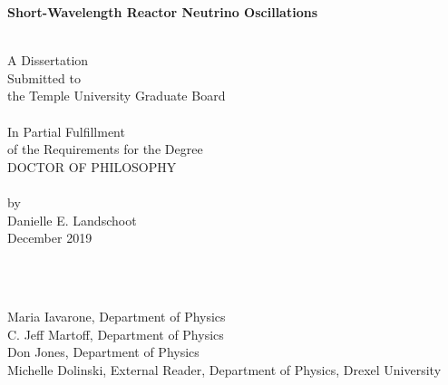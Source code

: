 \begin{titlepage}
	
	\begin{centering} 
		{\bf {\Large Short-Wavelength Reactor Neutrino Oscillations}}
		
		\vspace{1cm}
		\noindent\makebox[\linewidth]{\rule{16cm}{0.4pt}} \\ 
		\vspace{1cm}
		A Dissertation                       \\
		Submitted to                         \\
		the Temple University Graduate Board \\
		\vspace{1cm}
		\noindent\makebox[\linewidth]{\rule{16cm}{0.4pt}} \\ 
		\vspace{1cm} 
		In Partial Fulfillment               \\
		of the Requirements for the Degree   \\
		DOCTOR OF PHILOSOPHY                 \\
		\vspace{1cm} 
		\noindent\makebox[\linewidth]{\rule{16cm}{0.4pt}} \\ 
		\vspace{1cm} 
		by                                   \\
		Danielle E. Landschoot                      \\
		December 2019                            \\
	\end{centering}                      
	
	\vspace{1cm}
	\\
	\vspace{0.20cm}
	
	        \\
	{Maria Iavarone, Department of Physics}                                        \\
	{C. Jeff Martoff, Department of Physics}                                       \\
	{Don Jones, Department of Physics}                                       \\
	{Michelle  Dolinski, External Reader, Department of Physics, Drexel University}
	
\end{titlepage}
